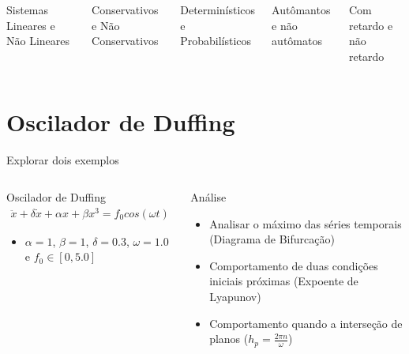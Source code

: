 \documentclass[12pt,aspectratio=169]{beamer}
\begin{document}
\begin{frame}
\begin{columns}
\begin{block}{}
Sistemas Lineares e Não Lineares
\end{block}
\begin{block}{}
Conservativos e Não Conservativos
\end{block}
\begin{block}{}
Determinísticos e Probabilísticos
\end{block}
\begin{block}{}
Autômantos e não autômatos
\end{block}
\begin{block}{}
Com retardo e não retardo
\end{block}
\end{columns}
\end{frame}





\section{Oscilador de Duffing}
\begin{frame}{Explorar dois exemplos}
\begin{columns}
\begin{block}{Oscilador de Duffing}
\begin{eqnarray}
\ddot{x}+\delta\dot{x}+\alpha x+\beta x^3 = f_0cos(\omega t)
\end{eqnarray}
\begin{itemize}
    \item $\alpha =1$, $\beta=1$, $\delta=0.3$, $\omega=1.0$ e $f_0 \in [0,5.0]$
\end{itemize}
\end{block}
\begin{block}{Análise}
\begin{itemize}
    \item Analisar o máximo das séries temporais (Diagrama de Bifurcação) 
    \item Comportamento de duas condições iniciais próximas (Expoente de Lyapunov)
    \item Comportamento quando a interseção de planos ($h_p=\frac{2\pi n}{\omega}$) 
\end{itemize}
\end{block}
\end{columns}
\end{frame}
\end{document}
